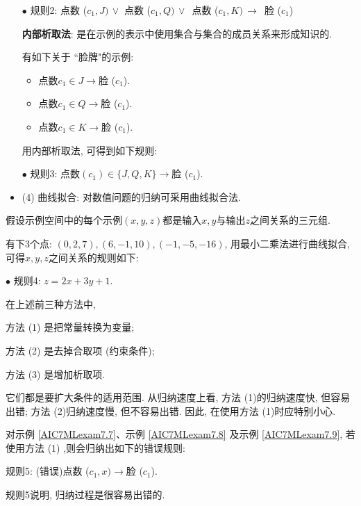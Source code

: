 \begin{itemize}
\begin{example}
 $\bullet$ 规则2: 点数 ($c_1, J)\, \vee$ 点数 ($c_1, Q)\, \vee$\, 点数 ($c_1, K)\, \rightarrow$\, 脸 ($c_1$)
\end{example}

 \textbf{内部析取法}: 是在示例的表示中使用集合与集合的成员关系来形成知识的.

\begin{example}\label{AIC7MLexam7.8}
有如下关于 ``脸牌"的示例:
\begin{itemize}
\item 点数$c_1\in {J}\rightarrow$脸 ($c_1$).
\item 点数$c_1\in {Q}\rightarrow$脸 ($c_1$).
\item 点数$c_1\in {K}\rightarrow$脸 ($c_1$).
\end{itemize}

用内部析取法, 可得到如下规则:
\begin{center}
    $\bullet$ 规则3: 点数$ (c_1)\in \{J, Q, K\}\rightarrow$脸 ($c_1$).
\end{center}
\end{example}
\item (4) 曲线拟合: 对数值问题的归纳可采用曲线拟合法.
\end{itemize}
假设示例空间中的每个示例$ (x, y, z)$都是输入$x, y$与输出$z$之间关系的三元组.
\begin{example}\label{AIC7MLexam7.9}
有下3个点: $ (0, 2, 7), (6, -1, 10), (-1, -5, -16)$, 用最小二乘法进行曲线拟合, 可得$x, y, z$之间关系的规则如下:

\begin{center}
    $\bullet$ 规则4: $z=2x+3y+1$.
\end{center}
\end{example}
\begin{remark}
在上述前三种方法中,

方法 (1) 是把常量转换为变量;

方法 (2) 是去掉合取项 (约束条件);

方法 (3) 是增加析取项.

它们都是要扩大条件的适用范围.
从归纳速度上看, 方法 (1)的归纳速度快, 但容易出错; 方法 (2)归纳速度慢, 但不容易出错. 因此, 在使用方法 (1)时应特别小心.

\begin{example}
对示例 \ref{AIC7MLexam7.7}、示例 \ref{AIC7MLexam7.8} 及示例  \ref{AIC7MLexam7.9}, 若使用方法 (1) ,则会归纳出如下的错误规则:

\begin{center}
    规则5: (错误)点数 ($c_1, x)\rightarrow$脸 ($c_1$).
\end{center}

规则5说明, 归纳过程是很容易出错的.
\end{example}
\end{remark}
